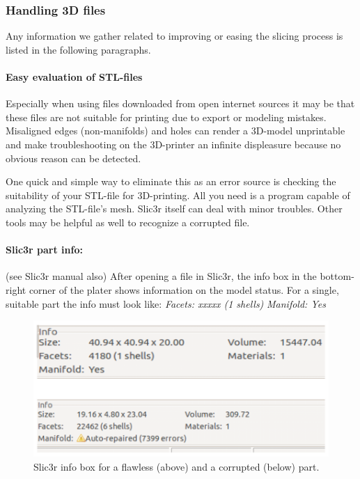 \subsubsection{Handling 3D files}

Any information we gather related to improving or easing the slicing process is listed in the following paragraphs. 


\paragraph{Easy evaluation of STL-files}

Especially when using files downloaded from open internet sources it may be that these files are not suitable for printing due to export or modeling mistakes. Misaligned edges (non-manifolds) and holes can render a 3D-model unprintable and make troubleshooting on the 3D-printer an infinite displeasure because no obvious reason can be detected.

One quick and simple way to eliminate this as an error source is checking the suitability of your STL-file for 3D-printing. All you need is a program capable of analyzing the STL-file's mesh.
Slic3r itself can deal with minor troubles. Other tools may be helpful as well to recognize a corrupted file. 

\paragraph{Slic3r part info:}

(see Slic3r manual also)
After opening a file in Slic3r, the info box in the bottom-right corner of the plater shows information on the model status. For a single, suitable part the info must look like:
\emph{Facets: xxxxx (1 shells)}
\emph{Manifold: Yes}

\begin{figure}[H]
  \centering
  \includegraphics[width=.7\linewidth]{./img/slic3r_brokenpart-analysis.png}
  \caption{Slic3r info box for a flawless (above) and a corrupted (below) part.}
\end{figure}

